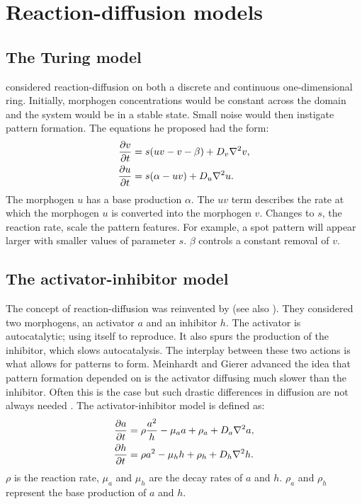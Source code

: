 \section{Reaction-diffusion models}
\subsection{The Turing model}
\citet{turing1952} considered reaction-diffusion on both a discrete and continuous one-dimensional ring. Initially, morphogen concentrations would be constant across the domain and the system would be in a stable state. Small noise would then instigate pattern formation. The equations he proposed had the form:
	\begin{equation}
	\begin{aligned} \label{eq:turingRD}
			\frac{\partial v}{\partial t} &= s(uv-v-\beta) + D_v \nabla^2 v,\\
			\frac{\partial u}{\partial t} &= s(\alpha-uv) + D_u \nabla^2 u.
	\end{aligned}
	\end{equation}
The morphogen $u$ has a base production $\alpha$. The $uv$ term describes the rate at which the morphogen $u$ is converted into the morphogen $v$. Changes to $s$, the reaction rate, scale the pattern features. For example, a spot pattern will appear larger with smaller values of parameter $s$. $\beta$ controls a constant removal of $v$.

\subsection{The activator-inhibitor model}
The concept of reaction-diffusion was reinvented by \citet{gierer1972} (see also \citep{meinhardt1982}). They considered two morphogens, an activator $a$ and an inhibitor $h$. The activator is autocatalytic; using itself to reproduce. It also spurs the production of the inhibitor, which slows autocatalysis. The interplay between these two actions is what allows for patterns to form. Meinhardt and Gierer advanced the idea that pattern formation depended on is the activator diffusing much slower than the inhibitor. Often this is the case but such drastic differences in diffusion are not always needed \citep{gray1984, marcon2016}. The activator-inhibitor model is defined as:
	\begin{equation}
	\begin{aligned} \label{eq:activatorInhibitorRD}
			\frac{\partial a}{\partial t} &= \rho \frac{a^2}{h} - \mu_a a + \rho_a + D_a \nabla^2 a,\\
			\frac{\partial h}{\partial t} &= \rho a^2 - \mu_h h  + \rho_h + D_h \nabla^2 h.
	\end{aligned}
	\end{equation}
$\rho$ is the reaction rate, $\mu_a$ and $\mu_h$ are the decay rates of $a$ and $h$. $\rho_a$ and $\rho_h$ represent the base production of $a$ and $h$. 

